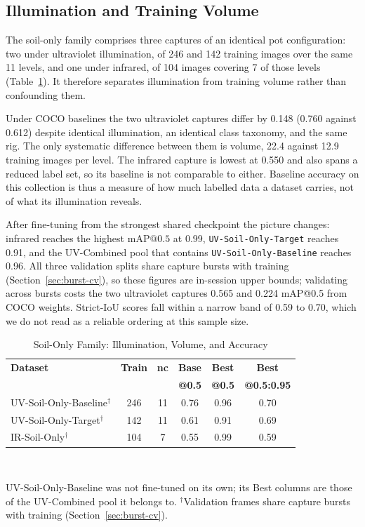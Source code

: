 ﻿\documentclass[journal]{IEEEtran}
\begin{document}
\subsection{Illumination and Training Volume}
The soil-only family comprises three captures of an identical pot configuration: two under ultraviolet illumination, of 246 and 142 training images over the same 11 levels, and one under infrared, of 104 images covering 7 of those levels (Table~\ref{tab:modality}). It therefore separates illumination from training volume rather than confounding them.

Under COCO baselines the two ultraviolet captures differ by 0.148 (0.760 against 0.612) despite identical illumination, an identical class taxonomy, and the same rig. The only systematic difference between them is volume, 22.4 against 12.9 training images per level. The infrared capture is lowest at 0.550 and also spans a reduced label set, so its baseline is not comparable to either. Baseline accuracy on this collection is thus a measure of how much labelled data a dataset carries, not of what its illumination reveals.

After fine-tuning from the strongest shared checkpoint the picture changes: infrared reaches the highest $\text{mAP@0.5}$ at 0.99, \texttt{UV-Soil-Only-Target} reaches 0.91, and the UV-Combined pool that contains \texttt{UV-Soil-Only-Baseline} reaches 0.96. All three validation splits share capture bursts with training (Section~\ref{sec:burst-cv}), so these figures are in-session upper bounds; validating across bursts costs the two ultraviolet captures 0.565 and 0.224 mAP@0.5 from COCO weights. Strict-IoU scores fall within a narrow band of 0.59 to 0.70, which we do not read as a reliable ordering at this sample size.

\begin{table}[!t]
\renewcommand{\arraystretch}{1.3}
\caption{Soil-Only Family: Illumination, Volume, and Accuracy}
\label{tab:modality}
\centering
\footnotesize
\setlength{\tabcolsep}{3.5pt}
\begin{tabular}{l c c c c c}
\toprule
\textbf{Dataset} & \textbf{Train} & \textbf{nc} & \textbf{Base} & \textbf{Best} & \textbf{Best} \\
 & & & \textbf{@0.5} & \textbf{@0.5} & \textbf{@0.5:0.95} \\
\midrule
UV-Soil-Only-Baseline$^{\dagger}$ & 246 & 11 & 0.76 & 0.96 & 0.70 \\
UV-Soil-Only-Target$^{\dagger}$ & 142 & 11 & 0.61 & 0.91 & 0.69 \\
IR-Soil-Only$^{\dagger}$ & 104 & 7 & 0.55 & 0.99 & 0.59 \\
\bottomrule
\end{tabular}
\\[2pt]
\parbox{\columnwidth}{\footnotesize UV-Soil-Only-Baseline was not fine-tuned on its own; its Best columns are those of the UV-Combined pool it belongs to. $^{\dagger}$Validation frames share capture bursts with training (Section~\ref{sec:burst-cv}).}
\end{table}
\end{document}
